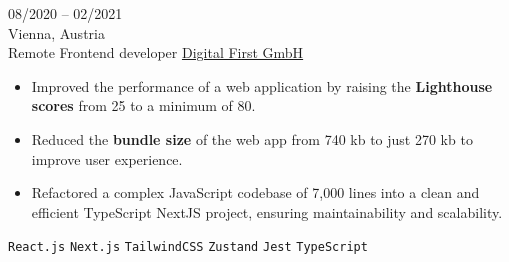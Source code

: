 \entry
{08/2020 -- 02/2021 \\ Vienna, Austria \\ Remote}
{Frontend developer}
{\href{https://dfirst.eu/}{Digital First GmbH}}
{\vspace{-10pt}
    \begin{itemize}[noitemsep,topsep=0pt,parsep=0pt,partopsep=0pt, leftmargin=-1pt]
        \item Improved the performance of a web application by raising the \textbf{Lighthouse scores} from 25 to a minimum of 80.
        \item Reduced the \textbf{bundle size} of the web app from 740 kb to just 270 kb to improve user experience.
        \item Refactored a complex JavaScript codebase of 7,000 lines into a clean and efficient TypeScript NextJS project, ensuring maintainability and scalability.
    \end{itemize}
    \texttt{React.js} \slashsep \texttt{Next.js} \slashsep \texttt{TailwindCSS} \slashsep \texttt{Zustand} \slashsep \texttt{Jest} \slashsep \texttt{TypeScript}
}
